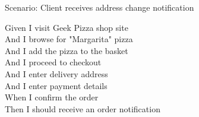     \begin{framed}
        Scenario: Client receives address change notification
        
        \begin{adjustwidth}{1cm}{}
            Given I visit Geek Pizza shop site \\
            And I browse for "Margarita" pizza \\
            And I add the pizza to the basket \\
            And I proceed to checkout \\
            And I enter delivery address \\ 
            And I enter payment details \\
            When I confirm the order \\
            Then I should receive an order notification
        \end{adjustwidth}
    \end{framed}
\fi